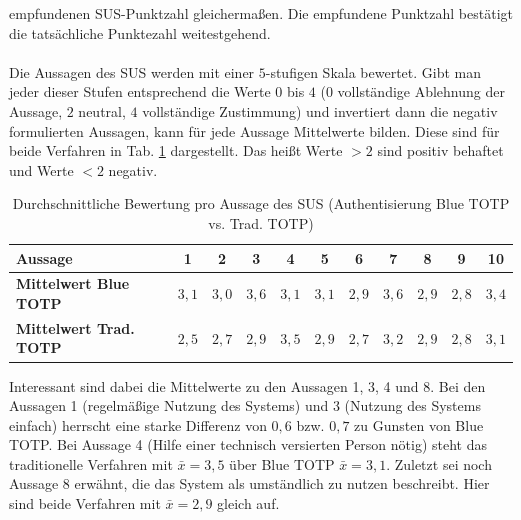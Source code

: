 \glqq empfundenen\grqq{} SUS-Punktzahl gleichermaßen. Die empfundene Punktzahl 
bestätigt die tatsächliche Punktezahl weitestgehend.
\\\\
Die Aussagen des SUS werden mit einer $5$-stufigen Skala bewertet. Gibt man jeder 
dieser Stufen entsprechend die Werte $0$ bis $4$ ($0$ vollständige Ablehnung der 
Aussage, $2$ neutral, $4$ vollständige Zustimmung) und invertiert dann die negativ 
formulierten Aussagen, kann für jede Aussage Mittelwerte bilden. Diese sind für beide 
Verfahren in Tab. \ref{tab: studie ergebnisse auth sus vs 11 single means} 
dargestellt. Das heißt Werte $> 2$ sind positiv behaftet und Werte $< 2$ negativ.
\begin{table}
    \centering
    \begin{center}
    \begin{tabular}{| l | c | c | c | c | c | c | c | c | c | c |}
        \hline
        \textbf{Aussage} & 1 & 2 & 3 & 4 & 5 & 6 & 7 & 8 & 9 & 10 \\
        \hline
        \textbf{Mittelwert Blue TOTP} & $3{,}1$ & $3{,}0$ & $3{,}6$ & $3{,}1$ & $3{,}1$ & $2{,}9$ & $3{,}6$ & $2{,}9$ & $2{,}8$ & $3{,}4$ \\  
        \hline
        \textbf{Mittelwert Trad. TOTP} & $2{,}5$ & $2{,}7$ & $2{,}9$ & $3{,}5$ & $2{,}9$ & $2{,}7$ & $3{,}2$ & $2{,}9$ & $2{,}8$ & $3{,}1$ \\
        \hline
    \end{tabular}
    \end{center}
    \caption[Durchschnittliche Bewertung pro Aussage des SUS (Authentisierung)]{Durchschnittliche Bewertung pro Aussage des SUS (Authentisierung Blue TOTP vs. Trad. TOTP)}
    \label{tab: studie ergebnisse auth sus vs 11 single means}
\end{table}
Interessant sind dabei die Mittelwerte zu den Aussagen 1, 3, 4 und 8. Bei den 
Aussagen 1 (regelmäßige Nutzung des Systems) und 3 (Nutzung des Systems einfach) 
herrscht eine starke Differenz von $0{,}6$ bzw. $0{,}7$ zu Gunsten von Blue TOTP. Bei 
Aussage 4 (Hilfe einer technisch versierten Person nötig) steht das traditionelle 
Verfahren mit $\bar{x} = 3{,}5$ über Blue TOTP $\bar{x} = 3{,}1$. Zuletzt sei noch 
Aussage 8 erwähnt, die das System als umständlich zu nutzen beschreibt. Hier sind 
beide Verfahren mit $\bar{x} = 2{,}9$ gleich auf.